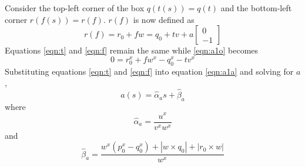 \documentclass[final,3p,times,twocolumn]{elsarticle}
\begin{document}
Consider the top-left corner of the box $q(t(s))=q(t)$ and the bottom-left corner $r(f(s))=r(f)$. $r(f)$ is now defined as
\begin{equation}
r(f) = r_0+fw = q_0+tv+a\begin{bmatrix}0\\-1\end{bmatrix} \label{eqn:ra}
\end{equation}
Equations \eqref{eqn:t} and \eqref{eqn:f} remain the same while \eqref{eqn:a1o} becomes
\begin{equation}
0 = r_0^x+fw^x-q_0^x-tv^x \label{eqn:a1a}
\end{equation}
Substituting equations \eqref{eqn:t} and \eqref{eqn:f} into equation \eqref{eqn:a1a} and solving for $a$,
\begin{equation}
a(s) = \hat{\alpha}_a s + \hat{\beta}_a \label{eqn:aa}
\end{equation}
where
\begin{equation}
\hat{\alpha}_a = \frac{u^x}{v^xw^x}
\end{equation}
and
\begin{equation}
\hat{\beta}_a = \frac{w^x(p_0^x-q_0^x)+|w \times q_0| + |r_0 \times w|}{w^x}
\end{equation}
\end{document}

